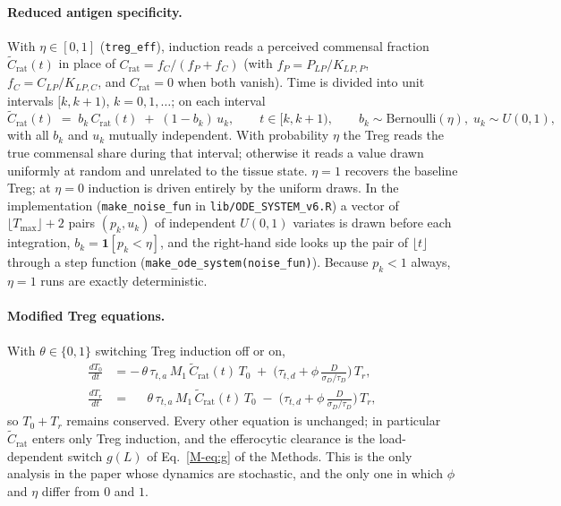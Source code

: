 \documentclass[11pt]{article}
\begin{document}
\paragraph{Reduced antigen specificity.}
With $\eta \in [0,1]$ (\texttt{treg\_eff}), induction reads a perceived
commensal fraction $\tilde C_{\mathrm{rat}}(t)$ in place of
$C_{\mathrm{rat}} = f_C/(f_P+f_C)$ (with $f_P = P_{LP}/K_{LP,P}$,
$f_C = C_{LP}/K_{LP,C}$, and $C_{\mathrm{rat}} = 0$ when both vanish). Time is
divided into unit intervals $[k, k+1)$, $k = 0, 1, \dots$; on each interval
\begin{equation}
  \tilde C_{\mathrm{rat}}(t) \;=\; b_k\, C_{\mathrm{rat}}(t) \;+\; (1-b_k)\, u_k,
  \qquad t \in [k, k+1),
  \qquad b_k \sim \mathrm{Bernoulli}(\eta),\; u_k \sim U(0,1),
  \label{eq:imp-eta}
\end{equation}
with all $b_k$ and $u_k$ mutually independent. With probability $\eta$ the
Treg reads the true commensal share during that interval; otherwise it reads a
value drawn uniformly at random and unrelated to the tissue state. $\eta = 1$ recovers the baseline Treg; at $\eta = 0$ induction is driven entirely by the
uniform draws. In the implementation (\texttt{make\_noise\_fun} in
\texttt{lib/ODE\_SYSTEM\_v6.R}) a vector of $\lfloor T_{\max}\rfloor + 2$
pairs $(p_k, u_k)$ of independent $U(0,1)$ variates is drawn before each
integration, $b_k = \mathbf{1}[p_k < \eta]$, and the right-hand side looks up
the pair of $\lfloor t\rfloor$ through a step function
(\texttt{make\_ode\_system(noise\_fun)}). Because $p_k < 1$ always,
$\eta = 1$ runs are exactly deterministic.

\paragraph{Modified Treg equations.}
With $\theta\in\{0,1\}$ switching Treg induction off or on,
\begin{align}
  \frac{dT_0}{dt} &= -\,\theta\,\tau_{t,a}\,M_1\,\tilde C_{\mathrm{rat}}(t)\,T_0
                     \;+\; \Big(\tau_{t,d} + \phi\,\frac{D}{\sigma_D/\tau_D}\Big)\,T_r, \\
  \frac{dT_r}{dt} &= \phantom{-}\,\theta\,\tau_{t,a}\,M_1\,\tilde C_{\mathrm{rat}}(t)\,T_0
                     \;-\; \Big(\tau_{t,d} + \phi\,\frac{D}{\sigma_D/\tau_D}\Big)\,T_r ,
\end{align}
so $T_0 + T_r$ remains conserved. Every other equation is unchanged; in
particular $\tilde C_{\mathrm{rat}}$ enters only Treg induction, and the
efferocytic clearance is the load-dependent switch
$g(L)$ of Eq.~\ref{M-eq:g} of the Methods. This is the only analysis in the
paper whose dynamics are stochastic, and the only one in which $\phi$ and
$\eta$ differ from $0$ and $1$.
\end{document}
